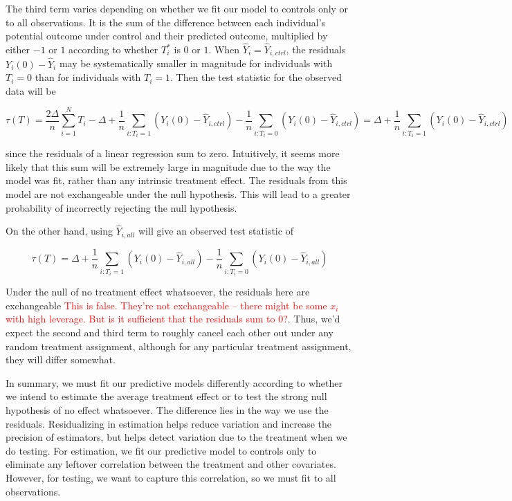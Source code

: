 \documentclass[12pt]{article}
\begin{document}
The third term varies depending on whether we fit our model to controls only or to all observations.  It is the sum of the difference between each individual's potential outcome under control and their predicted outcome, multiplied by either $-1$ or $1$ according to whether $T_i^*$ is $0$ or $1$.
When $\hat{Y}_i = \hat{Y}_{i, ctrl}$, the residuals $Y_i(0) - \hat{Y}_i$ may be systematically smaller in magnitude for individuals with $T_i=0$ than for individuals with $T_i=1$. Then the test statistic for the observed data will be

$$\tau(T) = \frac{2\Delta}{n}\sum_{i=1}^N T_i - \Delta + \frac{1}{n}\sum_{i: T_i=1} (Y_i(0) - \hat{Y}_{i, ctrl}) - \frac{1}{n}\sum_{i: T_i=0} (Y_i(0) - \hat{Y}_{i, ctrl}) = \Delta + \frac{1}{n}\sum_{i: T_i=1} (Y_i(0) - \hat{Y}_{i, ctrl})$$

since the residuals of a linear regression sum to zero.  Intuitively, it seems more likely that this sum will be extremely large in magnitude due to the way the model was fit, rather than any intrinsic treatment effect.  The residuals from this model are not exchangeable under the null hypothesis.  This will lead to a greater probability of incorrectly rejecting the null hypothesis.

On the other hand, using $\hat{Y}_{i, all}$ will give an observed test statistic of

$$\tau(T) = \Delta + \frac{1}{n}\sum_{i: T_i=1} (Y_i(0) - \hat{Y}_{i, all}) - \frac{1}{n}\sum_{i: T_i=0} (Y_i(0) - \hat{Y}_{i, all})$$ 

Under the null of no treatment effect whatsoever, the residuals here are exchangeable \textcolor{red}{This is false. They're not exchangeable -- there might be some $x_i$ with high leverage. But is it sufficient that the residuals sum to 0?}.  Thus, we'd expect the second and third term to roughly cancel each other out under any random treatment assignment, although for any particular treatment assignment, they will differ somewhat.  

In summary, we must fit our predictive models differently according to whether we intend to estimate the average treatment effect or to test the strong null hypothesis of no effect whatsoever.  The difference lies in the way we use the residuals.  Residualizing in estimation helps reduce variation and increase the precision of estimators, but helps detect variation due to the treatment when we do testing.  For estimation, we fit our predictive model to controls only to eliminate any leftover correlation between the treatment and other covariates.  However, for testing, we want to capture this correlation, so we must fit to all observations.
\end{document}
